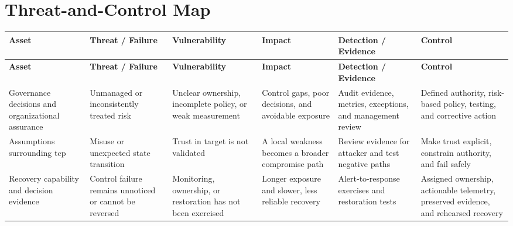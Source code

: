 \documentclass[11pt,letterpaper]{article}
\begin{document}
\section*{Threat-and-Control Map}
\begingroup\scriptsize\setlength{\tabcolsep}{2pt}
\begin{longtable}{>{\raggedright\arraybackslash}p{}>{\raggedright\arraybackslash}p{}>{\raggedright\arraybackslash}p{}>{\raggedright\arraybackslash}p{}>{\raggedright\arraybackslash}p{}>{\raggedright\arraybackslash}p{}}
\toprule\rowcolor{Navy}\color{white}\textbf{Asset} & \color{white}\textbf{Threat / Failure} & \color{white}\textbf{Vulnerability} & \color{white}\textbf{Impact} & \color{white}\textbf{Detection / Evidence} & \color{white}\textbf{Control}\\\midrule
\endfirsthead
\toprule\rowcolor{Navy}\color{white}\textbf{Asset} & \color{white}\textbf{Threat / Failure} & \color{white}\textbf{Vulnerability} & \color{white}\textbf{Impact} & \color{white}\textbf{Detection / Evidence} & \color{white}\textbf{Control}\\\midrule
\endhead
Governance decisions and organizational assurance & Unmanaged or inconsistently treated risk & Unclear ownership, incomplete policy, or weak measurement & Control gaps, poor decisions, and avoidable exposure & Audit evidence, metrics, exceptions, and management review & Defined authority, risk-based policy, testing, and corrective action\\\midrule
Assumptions surrounding tcp & Misuse or unexpected state transition & Trust in target is not validated & A local weakness becomes a broader compromise path & Review evidence for attacker and test negative paths & Make trust explicit, constrain authority, and fail safely\\\midrule
Recovery capability and decision evidence & Control failure remains unnoticed or cannot be reversed & Monitoring, ownership, or restoration has not been exercised & Longer exposure and slower, less reliable recovery & Alert-to-response exercises and restoration tests & Assigned ownership, actionable telemetry, preserved evidence, and rehearsed recovery\\\midrule
\bottomrule
\end{longtable}
\endgroup
\end{document}
